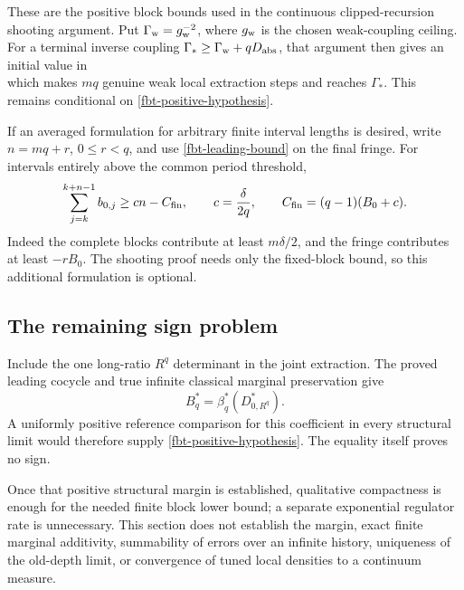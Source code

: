 \documentclass[11pt]{article}
\theoremstyle{remark}
\begin{document}
These are the positive block bounds used in the
continuous clipped-recursion shooting argument.
Put \(\Gamma_{\rm w}=g_{\rm w}^{-2}\), where
\(g_{\rm w}\) is the chosen weak-coupling ceiling.
For a terminal inverse coupling
\(\Gamma_*\ge\Gamma_{\rm w}+qD_{\rm abs}\), that argument
then gives an initial value in
\begin{equation}
 [\,\Gamma_*+m\delta/4,\ \Gamma_*+mqD_{\rm abs}\,]
 \label{fbt-shooting-interval}
\end{equation}
which makes \(mq\) genuine weak local extraction steps
and reaches \(\Gamma_*\). This remains conditional on
\eqref{fbt-positive-hypothesis}.

If an averaged formulation for arbitrary finite
interval lengths is desired, write \(n=mq+r\),
\(0\le r<q\), and use \eqref{fbt-leading-bound} on
the final fringe. For intervals entirely above the
common period threshold,
\begin{equation}
 \sum_{j=k}^{k+n-1}b_{0,j}
 \ge cn-C_{\rm fin},\qquad
 c=\frac{\delta}{2q},\qquad
 C_{\rm fin}=(q-1)(B_0+c).
 \label{fbt-optional-fringe}
\end{equation}
Indeed the complete blocks contribute at least
\(m\delta/2\), and the fringe contributes at least
\(-rB_0\). The shooting proof needs only the fixed-block
bound, so this additional formulation is optional.

\subsection{The remaining sign problem}
\label{fbt-scope}

Include the one long-ratio \(R^q\) determinant in the
joint extraction. The proved leading cocycle and true
infinite classical marginal preservation give
\begin{equation}
                         B_q^*
                          =\beta_q^*(D_{0,R^q}^*).
 \label{fbt-long-ratio}
\end{equation}
A uniformly positive reference comparison for this
coefficient in every structural limit would therefore
supply \eqref{fbt-positive-hypothesis}. The equality
itself proves no sign.

Once that positive structural margin is established,
qualitative compactness is enough for the needed finite
block lower bound; a separate exponential regulator
rate is unnecessary. This section does not establish
the margin, exact finite marginal additivity, summability
of errors over an infinite history, uniqueness of the
old-depth limit, or convergence of tuned local densities
to a continuum measure.
\end{document}
